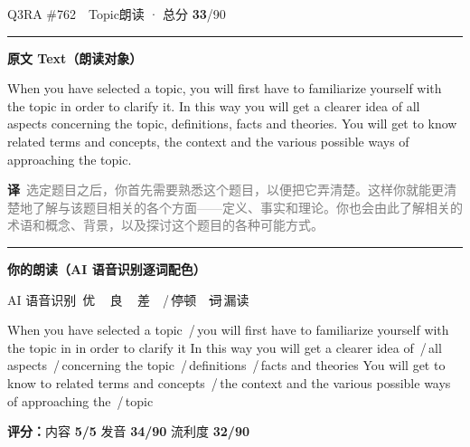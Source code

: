 \documentclass[11pt]{article}
\newcommand{\sfull}[1]{\textcolor{cFix}{\bfseries #1}}     %
\newcommand{\spart}[1]{\textcolor{cPartial}{\bfseries #1}} %
\newcommand{\ptesub}[1]{%
  \par\needspace{2\baselineskip}\smallskip
  {\color{cAccent}\rule[-0.2ex]{3pt}{1.05em}}\hspace{6pt}%
  {\bfseries\color{cHead}#1}\par\nopagebreak\smallskip}
\newcommand{\sg}[1]{\textcolor{cSpkGood}{#1}}   %
\newcommand{\sy}[1]{\textcolor{cSpkOk}{#1}}     %
\newcommand{\sr}[1]{\textcolor{cSpkBad}{#1}}    %
\newcommand{\pse}{{\color{gray}\,/\,}}          %
\newcommand{\asrlegend}{{\footnotesize\color{gray}AI 语音识别\quad
  {\color{cSpkGood}\textbullet}\,优\ \ {\color{cSpkOk}\textbullet}\,良\ \
  {\color{cSpkBad}\textbullet}\,差\ \ {\color{gray}/}\,停顿\ \
  {\color{cSpkBad}\sout{词}}\,漏读}}
\newcommand{\zh}[1]{{\footnotesize\textcolor{cNote}{\textbf{译}}\ \textcolor{gray}{#1}}}
\begin{document}
\begin{qblock}{Q3\quad RA \#762\ \ Topic}{朗读 · 总分 \textcolor{cAccent}{\bfseries 33}/90}
\ptesub{原文 Text（朗读对象）}
\begin{promptbox}
When you have selected a topic, you will first have to familiarize yourself with the topic in order to clarify it. In this way you will get a clearer idea of all aspects concerning the topic, definitions, facts and theories. You will get to know related terms and concepts, the context and the various possible ways of approaching the topic.
\end{promptbox}
\zh{选定题目之后，你首先需要熟悉这个题目，以便把它弄清楚。这样你就能更清楚地了解与该题目相关的各个方面——定义、事实和理论。你也会由此了解相关的术语和概念、背景，以及探讨这个题目的各种可能方式。}
\ptesub{你的朗读（AI 语音识别逐词配色）}
\asrlegend
\begin{asrbox}
\sg{When} \sg{you} \sg{have} \sg{selected} \sg{a} \sg{topic} \pse \sg{you} \sg{will} \sg{first} \sg{have} \sg{to} \sy{familiarize} \sy{yourself} \sg{with} \sg{the} \sy{topic} \sg{in} \sg{in} \sg{order} \sg{to} \sg{clarify} \sy{it} \sg{In} \sg{this} \sg{way} \sg{you} \sg{will} \sg{get} \sg{a} \sy{clearer} \sg{idea} \sy{of} \pse \sg{all} \sy{aspects} \pse \sy{concerning} \sy{the} \sg{topic} \pse \sy{definitions} \pse \sy{facts} \sg{and} \sy{theories} \sg{You} \sg{will} \sg{get} \sr{to} \sg{know} \sg{to} \sg{related} \sy{terms} \sg{and} \sg{concepts} \pse \sg{the} \sr{context} \sg{and} \sg{the} \sy{various} \sg{possible} \sy{ways} \sy{of} \sg{approaching} \sg{the} \pse \sg{topic}
\end{asrbox}
\smallskip
{\small\textbf{评分：}内容 \sfull{5/5} \quad\textperiodcentered\quad 发音 \spart{34/90} \quad\textperiodcentered\quad 流利度 \spart{32/90}}\quad{\footnotesize\color{gray}（用时 01:09）}
\end{qblock}
\end{document}
